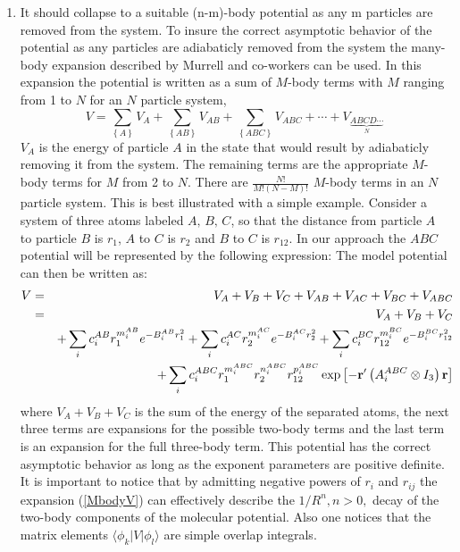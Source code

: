 \begin{enumerate}
\item  It should collapse to a suitable (n-m)-body potential as any m
particles are removed from the system.
To insure the correct asymptotic behavior of the potential as any particles
are adiabaticly removed from the system the many-body expansion described
by Murrell and co-workers\cite{Murrell84} can be used. In this expansion the
potential is written as a sum of $M$-body terms with $M$ ranging from 1 to $N
$ for an $N$ particle system, 
\begin{equation}
V=\sum_{\left\{ A\right\} }V_A+\sum_{\left\{ AB\right\}
}V_{AB}+\sum_{\left\{ ABC\right\} }V_{ABC}+\cdots 
+ V_{\underbrace{ABCD \cdots}_N}
%
\end{equation}
$V_A$ is the energy of particle $A$ in the state that
would result by adiabaticly removing it from the system. The remaining
terms are the appropriate $M$-body terms for $M$ from 2 to $N$. There are $%
\frac{N!}{M!\left( N-M\right) !}$ $M$-body terms in an $N$
particle system. This is best illustrated with a simple example. Consider a
system of three atoms labeled $A,\,B,\,C$, so that the distance from
particle $A$ to particle $B$ is $r_1$, $A$ to $C$ is $r_2$ and $B$ to $C$ is 
$r_{12}$. In our approach the $ABC$ 
potential will be represented by the following expression:
The model potential can then be written as: 
\begin{eqnarray}
V &=&V_A+V_B+V_C+V_{AB}+V_{AC}+V_{BC}+V_{ABC}  \nonumber \\
&=&V_A+V_B+V_C  \nonumber \\
&&+\sum_i c_i^{AB}r_1^{m_i^{AB}}e^{-B_i^{AB}r_1^2}+\sum_i
c_i^{AC}r_2^{m_i^{AC}}e^{-B_i^{AC}r_2^2}+\sum_i
c_i^{BC}r_{12}^{m_i^{BC}}e^{-B_i^{BC}r_{12}^2}  \nonumber \\
&&+\sum_i c_i^{ABC}r_1^{m_i^{ABC}}r_2^{n_i^{ABC}}r_{12}^{p_i^{ABC}}\exp \left[
-{\bf r}^{\prime }\left( A_i^{ABC}\otimes I_3\right) {\bf r}\right] 
\label{MbodyV}
\end{eqnarray}
where $V_A+V_B+V_C$ is the sum of the energy of the separated atoms, the
next three terms are expansions for the possible two-body terms and the last
term is an expansion for the full three-body term. This potential has the
correct asymptotic behavior as long as the exponent parameters are positive
definite. It is important to notice 
that by admitting negative powers of $r_i$ and $r_{ij}$ 
the expansion (\ref{MbodyV}) 
can effectively describe the $1/R^n, n > 0,$
decay of the two-body components of the molecular potential.
Also one notices
that the matrix elements
$\langle \phi_k | V | \phi_l \rangle$ are simple overlap integrals.



\end{enumerate}
